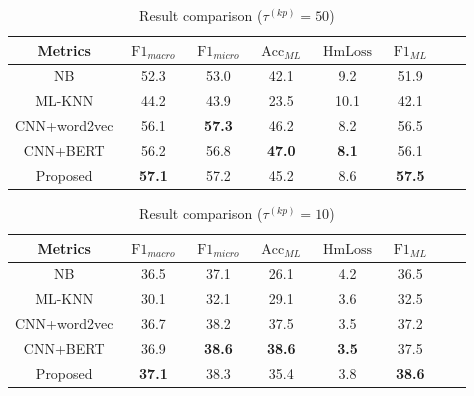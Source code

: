 \begin{table}
	\centering
	\caption{Result comparison (\(\tau^{(kp)}=50 \))}\label{tbl:bsline3}
	\begin{tabular}{cccccccc}
		\toprule
		Metrics      & \(\operatorname{F1}_{macro}\) & \(\operatorname{F1}_{micro}\) & \(\operatorname{Acc}_{ML}\) & \(\operatorname{HmLoss}\) & \(\operatorname{F1}_{ML}\) \\
		\midrule
		NB           & 52.3                          & 53.0                          & 42.1                        & 9.2                       & 51.9                       \\
		ML-KNN       & 44.2                          & 43.9                          & 23.5                        & 10.1                      & 42.1                       \\
		CNN+word2vec & 56.1                          & \textbf{57.3}                 & 46.2                        & 8.2                       & 56.5                       \\
		CNN+BERT     & 56.2                          & 56.8                          & \textbf{47.0}               & \textbf{8.1}              & 56.1                       \\
		Proposed     & \textbf{57.1}                 & 57.2                          & 45.2                        & 8.6                       & \textbf{57.5}              \\
		\bottomrule
	\end{tabular}
\end{table}

\begin{table}
	\centering
	\caption{Result comparison (\(\tau^{(kp)}=10 \))}\label{tbl:bsline4}
	\begin{tabular}{cccccccc}
		\toprule
		Metrics      & \(\operatorname{F1}_{macro}\) & \(\operatorname{F1}_{micro}\) & \(\operatorname{Acc}_{ML}\) & \(\operatorname{HmLoss}\) & \(\operatorname{F1}_{ML}\) \\
		\midrule
		NB           & 36.5                          & 37.1                          & 26.1                        & 4.2                       & 36.5                       \\
		ML-KNN       & 30.1                          & 32.1                          & 29.1                        & 3.6                       & 32.5                       \\
		CNN+word2vec & 36.7                          & 38.2                          & 37.5                        & 3.5                       & 37.2                       \\
		CNN+BERT     & 36.9                          & \textbf{38.6}                 & \textbf{38.6}               & \textbf{3.5}              & 37.5                       \\
		Proposed     & \textbf{37.1}                 & 38.3                          & 35.4                        & 3.8                       & \textbf{38.6}              \\
		\bottomrule
	\end{tabular}
\end{table}

